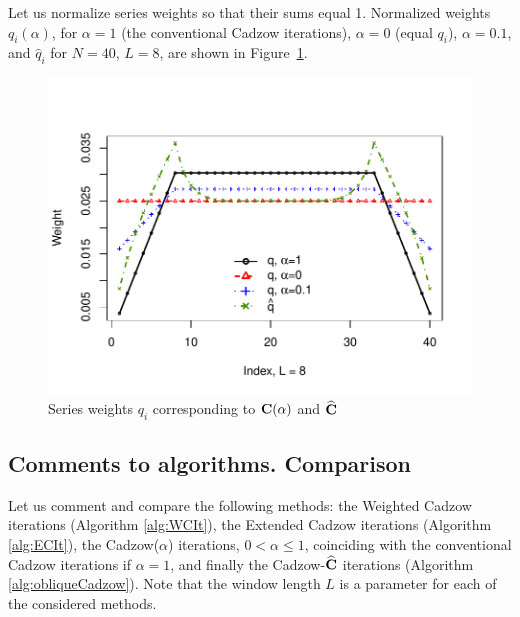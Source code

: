 \documentclass[sii]{ipart}
\begin{document}
Let us normalize series weights so that their sums equal 1. 
Normalized weights $q_i(\alpha)$, for $\alpha = 1$ (the conventional Cadzow iterations), $\alpha = 0$ (equal $q_i$), $\alpha = 0.1$,
and $\hat{q}_i$ for $N = 40$, $L = 8$, are shown in Figure~\ref{img_weights}.
\begin{figure}
		\includegraphics[width =\columnwidth]{weights.pdf}\caption{Series weights $q_i$ corresponding to $\mathbf{C}(\alpha)$ and $\widehat{\mathbf{C}}$}\label{img_weights}
\end{figure}
	
	\subsection{Comments to algorithms. Comparison}
\label{sec:comments}
	
	Let us comment and compare the following methods: the Weighted Cadzow iterations (Algorithm \ref{alg:WCIt}), the Extended Cadzow iterations (Algorithm \ref{alg:ECIt}), the Cadzow($\alpha$) iterations, $0< \alpha \leq 1$, coinciding with the conventional Cadzow iterations if $\alpha=1$,
	and finally the Cadzow-$\widehat{\mathbf{C}}$ iterations (Algorithm \ref{alg:obliqueCadzow}).
	Note that the window length $L$ is a parameter for each of the considered methods.
	
\end{document}
